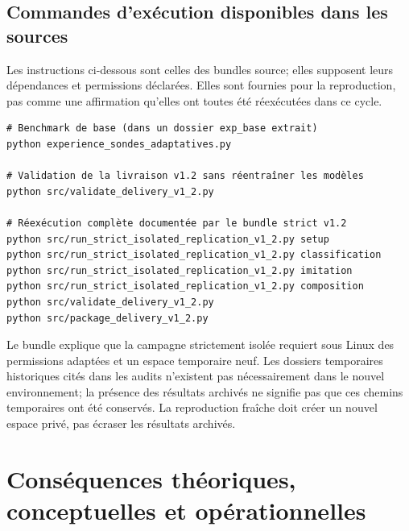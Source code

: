 \documentclass[11pt,a4paper,oneside]{report}
\begin{document}
\section{Commandes d'exécution disponibles dans les sources}
Les instructions ci-dessous sont celles des bundles source; elles supposent leurs dépendances et permissions déclarées. Elles sont fournies pour la reproduction, pas comme une affirmation qu'elles ont toutes été réexécutées dans ce cycle.
\begin{verbatim}
# Benchmark de base (dans un dossier exp_base extrait)
python experience_sondes_adaptatives.py

# Validation de la livraison v1.2 sans réentraîner les modèles
python src/validate_delivery_v1_2.py

# Réexécution complète documentée par le bundle strict v1.2
python src/run_strict_isolated_replication_v1_2.py setup
python src/run_strict_isolated_replication_v1_2.py classification
python src/run_strict_isolated_replication_v1_2.py imitation
python src/run_strict_isolated_replication_v1_2.py composition
python src/validate_delivery_v1_2.py
python src/package_delivery_v1_2.py
\end{verbatim}
Le bundle explique que la campagne strictement isolée requiert sous Linux des permissions adaptées et un espace temporaire neuf. Les dossiers temporaires historiques cités dans les audits n'existent pas nécessairement dans le nouvel environnement; la présence des résultats archivés ne signifie pas que ces chemins temporaires ont été conservés. La reproduction fraîche doit créer un nouvel espace privé, pas écraser les résultats archivés.

\chapter{Conséquences théoriques, conceptuelles et opérationnelles}
\end{document}
